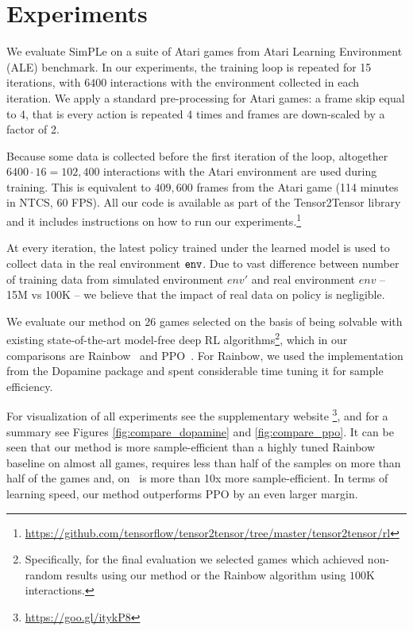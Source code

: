 \section{Experiments}
\label{sec:experiments}

We evaluate SimPLe on a suite of Atari games from Atari Learning Environment (ALE) benchmark.
In our experiments, the training loop is repeated for 15 iterations, with $6400$ interactions with the environment collected in each iteration.
We apply a standard pre-processing for Atari games: a frame skip equal to 4, that is every action
is repeated 4 times and frames are down-scaled by a factor of 2.

Because some data is collected before the first iteration of the loop,
altogether $6400 \cdot 16 = 102,400$ interactions with the Atari environment are used during training.
This is equivalent to $409,600$ frames from the Atari game (114 minutes in NTCS, 60 FPS).
All our code is available as part of the Tensor2Tensor library and it includes instructions on how
to run our experiments.\footnote{\url{https://github.com/tensorflow/tensor2tensor/tree/master/tensor2tensor/rl}} 

At every iteration, the latest policy trained under the learned model is used to collect data in the real environment ${\texttt{env}}$.
Due to vast difference between number of training data from simulated environment $env'$ and real environment $env$ -- 15M vs 100K
-- we believe that the impact of real data on policy is negligible.

 We evaluate our method on $26$ games selected on the basis of being solvable with existing state-of-the-art model-free deep RL algorithms\footnote{Specifically, for the final evaluation we selected games which achieved non-random results using our method or the Rainbow algorithm using $100$K interactions.}, which in our comparisons are Rainbow~\cite{rainbow} and PPO~\cite{ppo}.
 For Rainbow, we used the implementation from the Dopamine package and spent considerable
 time tuning it for sample efficiency.

For visualization of all experiments see the supplementary website \footnote{\url{https://goo.gl/itykP8}},
and for a summary see Figures \ref{fig:compare_dopamine} and  \ref{fig:compare_ppo}.
It can be seen that our method is more sample-efficient than a highly tuned Rainbow baseline
on almost all games, requires less than half of the samples on more than half of the games
and, on \freeway\, is more than 10x more sample-efficient. In terms of learning speed, our method outperforms PPO by an even larger margin.